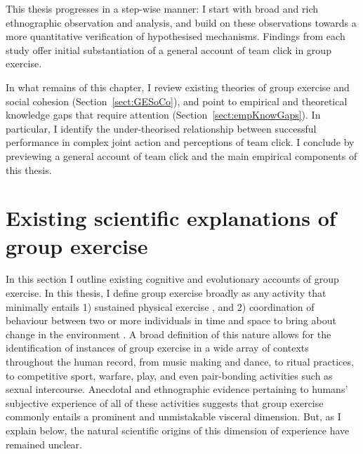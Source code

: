 \begin{CJK}{UTF8}{gbsn}
This thesis progresses in a step-wise manner: I start with broad and rich ethnographic observation and analysis, and build on these observations towards a more quantitative verification of hypothesised mechanisms.  Findings from each study offer initial substantiation of a general account of team click in group exercise.


In what remains of this chapter, I review existing theories of group exercise and social cohesion (Section~\ref{sect:GESoCo}), and point to empirical and theoretical knowledge gaps that require attention (Section~\ref{sect:empKnowGaps}).  In particular, I identify the under-theorised relationship between successful performance in complex joint action and perceptions of team click.  I conclude by previewing a general account of team click and the main empirical components of this thesis.



\section{Existing scientific explanations of group exercise\label{sect:GESoCo}}

In this section I outline existing cognitive and evolutionary accounts of group exercise.  In this thesis, I define group exercise broadly as any activity that minimally entails 1) sustained physical exercise \citep[i.e., structured physical activity that reaches at least low intensity physiological exertion of 45\% of max heart rate or above; see][]{Caspersen1985}, and 2) coordination of behaviour between two or more individuals in time and space to bring about change in the environment \citep[a.k.a., joint action, see][]{Sebanz2006,Vesper2010}.  A broad definition of this nature allows for the identification of instances of group exercise in a wide array of contexts throughout the human record, from music making and dance, to ritual practices, to competitive sport, warfare, play, and even pair-bonding activities such as sexual intercourse.  Anecdotal and ethnographic evidence pertaining to humans' subjective experience of all of these activities suggests that group exercise commonly entails a prominent and unmistakable visceral dimension. But, as I explain below, the natural scientific origins of this dimension of experience have remained unclear.



\end{CJK}
